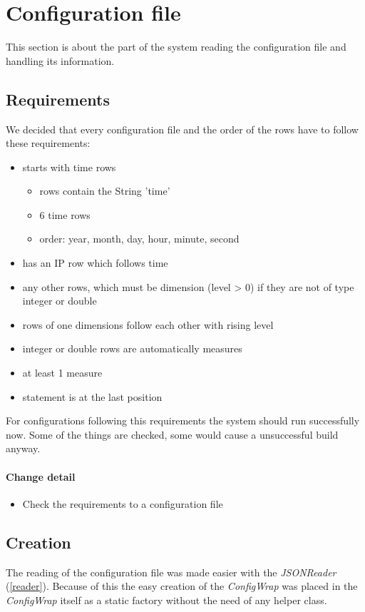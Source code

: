 \section{Configuration file}
This section is about the part of the system reading the configuration file
and handling its information.

\subsection{Requirements}
We decided that every configuration file and the order of the 
rows have to follow these requirements:
\begin{itemize}
  \item starts with time rows
  \begin{itemize}
    \item rows contain the String 'time'
    \item 6 time rows
    \item order: year, month, day, hour, minute, second 
  \end{itemize}
  \item has an IP row which follows time
  \item any other rows, which must be dimension (level > 0) if they are not of
  type integer or double
  \item rows of one dimensions follow each other with rising level
  \item integer or double rows are automatically measures
  \item at least 1 measure
  \item statement is at the last position
\end{itemize} 

For configurations following this requirements the system should run
successfully now. Some of the things are checked, some would cause a unsuccessful build anyway.

\paragraph{Change detail}
\begin{itemize}
  \item Check the requirements to a configuration file
\end{itemize}

\subsection{Creation}
The reading of the configuration file was made easier with the
\textit{JSONReader} (\ref{reader}). Because of this the easy creation
of the \textit{ConfigWrap} was placed in the \textit{ConfigWrap} itself as
a static factory without the need of any helper class.

